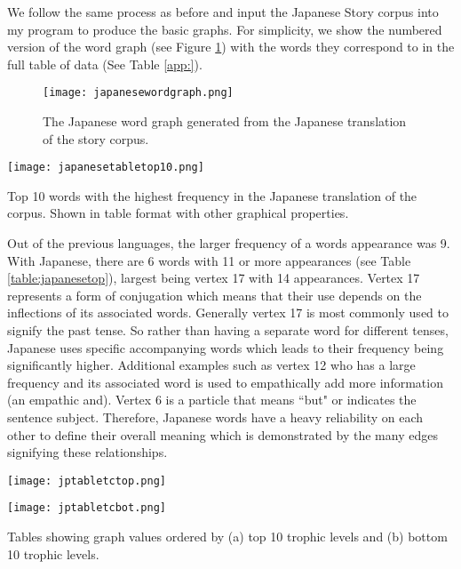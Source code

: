 We follow the same process as before and input the Japanese Story corpus into my program to produce the basic graphs. For simplicity, we show the numbered version of the word graph (see Figure \ref{fig:jpgraph}) with the words they correspond to in the full table of data (See Table \ref{app:}).

\begin{figure}[!htb]
\centering
\texttt{[image: japanesewordgraph.png]}
\caption{The Japanese word graph generated from the Japanese translation of the story corpus.}
\label{fig:jpgraph}
\end{figure}

\begin{table}[!htb]
\centering
\texttt{[image: japanesetabletop10.png]}
\caption{Top 10 words with the highest frequency in the Japanese translation of the corpus. Shown in table format with other graphical properties. }
\label{table:japanesetop}
\end{table}

Out of the previous languages, the larger frequency of a words appearance was 9. With Japanese, there are 6 words with 11 or more appearances (see Table \ref{table:japanesetop}), largest being vertex 17 with 14 appearances. Vertex 17 represents a form of conjugation which means that their use depends on the inflections of its associated words. Generally vertex 17 is most commonly used to signify the past tense. So rather than having a separate word for different tenses, Japanese uses specific accompanying words which leads to their frequency being significantly higher. Additional examples such as vertex 12 who has a large frequency and its associated word is used to empathically add more information (an empathic and). Vertex 6 is a particle that means ``but" or indicates the sentence subject. Therefore, Japanese words have a heavy reliability on each other to define their overall meaning which is demonstrated by the many edges signifying these relationships.

\begin{table}[!htb]
\centering
\begin{subtable}{.45\textwidth}
	\centering
	\texttt{[image: jptabletctop.png]}
	\caption{}
	\label{table:japanesentoptc}
\end{subtable}
\hfill
\begin{subtable}{.45\textwidth}
	\centering
	\texttt{[image: jptabletcbot.png]}
	\caption{}
	\label{table:japanesebottc}
\end{subtable}
\caption{Tables showing graph values ordered by (a) top 10 trophic levels and (b) bottom 10 trophic levels.}
\end{table}

